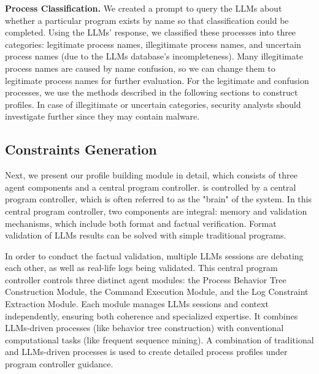 \noindent
{\bf Process Classification.} \label{sec:classifition}
We created a prompt to query the LLMs about whether a particular program exists by name so that classification could be completed. Using the LLMs' response, we classified these processes into three categories: legitimate process names, illegitimate process names, 
and uncertain process names (due to the LLMs database's incompleteness). Many illegitimate process names are caused by name confusion, so we can change them to legitimate process names for further evaluation.
For the legitimate and confusion processes, we use the methods described in the following sections to construct profiles. In case of illegitimate or uncertain categories, security analysts should investigate further since they may contain malware.

\subsection{Constraints Generation}
\label{sec:profile_con}
Next, we present our profile building module in detail, which consists of three agent components and a central program controller.
\tool is controlled by a central program controller, which is often referred to as the "brain" of the system. In this central program controller, two components are integral: memory and validation mechanisms, which include both format and factual verification. 
Format validation of LLMs results can be solved with simple traditional programs.

In order to conduct the factual validation, multiple LLMs sessions are debating each other, as well as real-life logs being validated.
This central program controller controls three distinct agent modules: the Process Behavior Tree Construction Module, the Command Execution Module, and the Log Constraint Extraction Module. Each module manages LLMs sessions and context independently, ensuring both coherence and specialized expertise. It combines LLMs-driven processes (like behavior tree construction) with conventional computational tasks (like frequent sequence mining). A combination of traditional and LLMs-driven processes is used to create detailed process profiles under program controller guidance.


